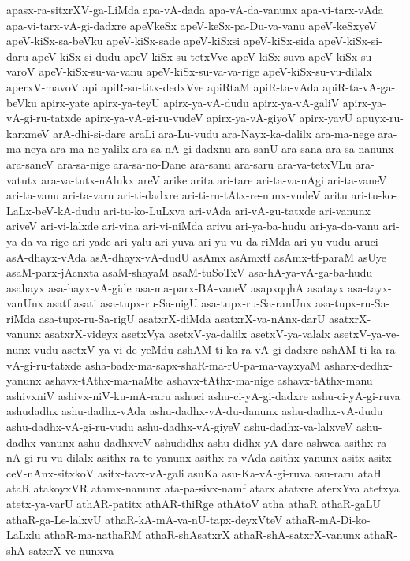 {apasx-ra-sitxrXV-ga-LiMda
apa-vA-dada
apa-vA-da-vanunx
apa-vi-tarx-vAda
apa-vi-tarx-vA-gi-dadxre
apeVkeSx
apeV-keSx-pa-Du-va-vanu
apeV-keSxyeV
apeV-kiSx-sa-beVku
apeV-kiSx-sade
apeV-kiSxsi
apeV-kiSx-sida
apeV-kiSx-si-daru
apeV-kiSx-si-dudu
apeV-kiSx-su-tetxVve
apeV-kiSx-suva
apeV-kiSx-su-varoV
apeV-kiSx-su-va-vanu
apeV-kiSx-su-va-va-rige
apeV-kiSx-su-vu-dilalx
aperxV-mavoV
api
apiR-su-titx-dedxVve
apiRtaM
apiR-ta-vAda
apiR-ta-vA-ga-beVku
apirx-yate
apirx-ya-teyU
apirx-ya-vA-dudu
apirx-ya-vA-galiV
apirx-ya-vA-gi-ru-tatxde
apirx-ya-vA-gi-ru-vudeV
apirx-ya-vA-giyoV
apirx-yavU
apuyx-ru-karxmeV
arA-dhi-si-dare
araLi
ara-Lu-vudu
ara-Nayx-ka-dalilx
ara-ma-nege
ara-ma-neya
ara-ma-ne-yalilx
ara-sa-nA-gi-dadxnu
ara-sanU
ara-sana
ara-sa-nanunx
ara-saneV
ara-sa-nige
ara-sa-no-Dane
ara-sanu
ara-saru
ara-va-tetxVLu
ara-vatutx
ara-va-tutx-nAlukx
areV
arike
arita
ari-tare
ari-ta-va-nAgi
ari-ta-vaneV
ari-ta-vanu
ari-ta-varu
ari-ti-dadxre
ari-ti-ru-tAtx-re-nunx-vudeV
aritu
ari-tu-ko-LaLx-beV-kA-dudu
ari-tu-ko-LuLxva
ari-vAda
ari-vA-gu-tatxde
ari-vanunx
ariveV
ari-vi-lalxde
ari-vina
ari-vi-niMda
arivu
ari-ya-ba-hudu
ari-ya-da-vanu
ari-ya-da-va-rige
ari-yade
ari-yalu
ari-yuva
ari-yu-vu-da-riMda
ari-yu-vudu
aruci
asA-dhayx-vAda
asA-dhayx-vA-dudU
asAmx
asAmxtf
asAmx-tf-paraM
asUye
asaM-parx-jAcnxta
asaM-shayaM
asaM-tuSoTxV
asa-hA-ya-vA-ga-ba-hudu
asahayx
asa-hayx-vA-gide
asa-ma-parx-BA-vaneV
asapxqqhA
asatayx
asa-tayx-vanUnx
asatf
asati
asa-tupx-ru-Sa-nigU
asa-tupx-ru-Sa-ranUnx
asa-tupx-ru-Sa-riMda
asa-tupx-ru-Sa-rigU
asatxrX-diMda
asatxrX-va-nAnx-darU
asatxrX-vanunx
asatxrX-videyx
asetxVya
asetxV-ya-dalilx
asetxV-ya-valalx
asetxV-ya-ve-nunx-vudu
asetxV-ya-vi-de-yeMdu
ashAM-ti-ka-ra-vA-gi-dadxre
ashAM-ti-ka-ra-vA-gi-ru-tatxde
asha-badx-ma-sapx-shaR-ma-rU-pa-ma-vayxyaM
asharx-dedhx-yanunx
ashavx-tAthx-ma-naMte
ashavx-tAthx-ma-nige
ashavx-tAthx-manu
ashivxniV
ashivx-niV-ku-mA-raru
ashuci
ashu-ci-yA-gi-dadxre
ashu-ci-yA-gi-ruva
ashudadhx
ashu-dadhx-vAda
ashu-dadhx-vA-du-danunx
ashu-dadhx-vA-dudu
ashu-dadhx-vA-gi-ru-vudu
ashu-dadhx-vA-giyeV
ashu-dadhx-va-lalxveV
ashu-dadhx-vanunx
ashu-dadhxveV
ashudidhx
ashu-didhx-yA-dare
ashwca
asithx-ra-nA-gi-ru-vu-dilalx
asithx-ra-te-yanunx
asithx-ra-vAda
asithx-yanunx
asitx
asitx-ceV-nAnx-sitxkoV
asitx-tavx-vA-gali
asuKa
asu-Ka-vA-gi-ruva
asu-raru
ataH
ataR
atakoyxVR
atamx-nanunx
ata-pa-sivx-namf
atarx
atatxre
aterxYva
atetxya
atetx-ya-varU
athAR-patitx
athAR-thiRge
athAtoV
atha
athaR
athaR-gaLU
athaR-ga-Le-lalxvU
athaR-kA-mA-va-nU-tapx-deyxVteV
athaR-mA-Di-ko-LaLxlu
athaR-ma-nathaRM
athaR-shAsatxrX
athaR-shA-satxrX-vanunx
athaR-shA-satxrX-ve-nunxva
}
